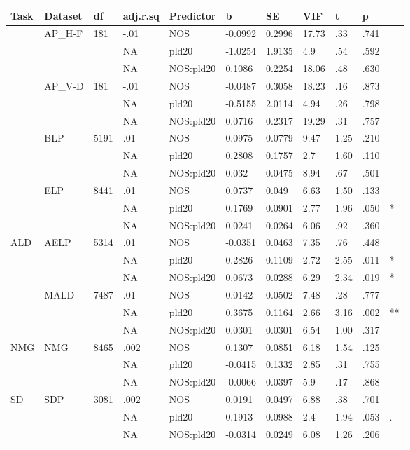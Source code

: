 \begin{table}[ht]
\centering
\begingroup\normalsize
\begin{tabular}{lllllllllll}
  \hline
Task & Dataset & df & adj.r.sq & Predictor & b & SE & VIF & t & p &  \\ 
  \hline
 & AP\_H-F & 181 & -.01 & NOS & -0.0992 & 0.2996 & 17.73 & .33 & .741 &   \\ 
   &  &  & NA & pld20 & -1.0254 & 1.9135 & 4.9 & .54 & .592 &   \\ 
   &  &  & NA & NOS:pld20 & 0.1086 & 0.2254 & 18.06 & .48 & .630 &   \\ 
   & AP\_V-D & 181 & -.01 & NOS & -0.0487 & 0.3058 & 18.23 & .16 & .873 &   \\ 
   &  &  & NA & pld20 & -0.5155 & 2.0114 & 4.94 & .26 & .798 &   \\ 
   &  &  & NA & NOS:pld20 & 0.0716 & 0.2317 & 19.29 & .31 & .757 &   \\ 
   & BLP & 5191 & .01 & NOS & 0.0975 & 0.0779 & 9.47 & 1.25 & .210 &   \\ 
   &  &  & NA & pld20 & 0.2808 & 0.1757 & 2.7 & 1.60 & .110 &   \\ 
   &  &  & NA & NOS:pld20 & 0.032 & 0.0475 & 8.94 & .67 & .501 &   \\ 
   & ELP & 8441 & .01 & NOS & 0.0737 & 0.049 & 6.63 & 1.50 & .133 &   \\ 
   &  &  & NA & pld20 & 0.1769 & 0.0901 & 2.77 & 1.96 & .050 & * \\ 
   &  &  & NA & NOS:pld20 & 0.0241 & 0.0264 & 6.06 & .92 & .360 &   \\ 
  ALD & AELP & 5314 & .01 & NOS & -0.0351 & 0.0463 & 7.35 & .76 & .448 &   \\ 
   &  &  & NA & pld20 & 0.2826 & 0.1109 & 2.72 & 2.55 & .011 & * \\ 
   &  &  & NA & NOS:pld20 & 0.0673 & 0.0288 & 6.29 & 2.34 & .019 & * \\ 
   & MALD & 7487 & .01 & NOS & 0.0142 & 0.0502 & 7.48 & .28 & .777 &   \\ 
   &  &  & NA & pld20 & 0.3675 & 0.1164 & 2.66 & 3.16 & .002 & ** \\ 
   &  &  & NA & NOS:pld20 & 0.0301 & 0.0301 & 6.54 & 1.00 & .317 &   \\ 
  NMG & NMG & 8465 & .002 & NOS & 0.1307 & 0.0851 & 6.18 & 1.54 & .125 &   \\ 
   &  &  & NA & pld20 & -0.0415 & 0.1332 & 2.85 & .31 & .755 &   \\ 
   &  &  & NA & NOS:pld20 & -0.0066 & 0.0397 & 5.9 & .17 & .868 &   \\ 
  SD & SDP & 3081 & .002 & NOS & 0.0191 & 0.0497 & 6.88 & .38 & .701 &   \\ 
   &  &  & NA & pld20 & 0.1913 & 0.0988 & 2.4 & 1.94 & .053 & . \\ 
   &  &  & NA & NOS:pld20 & -0.0314 & 0.0249 & 6.08 & 1.26 & .206 &   \\ 
   \hline
\end{tabular}
\endgroup
\end{table}
